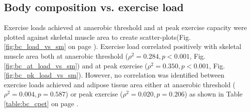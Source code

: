 \subsection{Body composition vs. exercise load}

Exercise loads achieved at anaerobic threshold and at peak exercise capacity were plotted against skeletal muscle area to create scatter-plots(Fig. \ref{fig:bc_load_vs_sm} on page \pageref{fig:bc_load_vs_sm}).  
Exercise load correlated positively with skeletal muscle area both at anaerobic threshold ($\rho^2 = 0.284, p < 0.001$, Fig. \ref{fig:bc_at_load_vs_sm}) and at peak exercise ($\rho^2 = 0.350, p < 0.001$, Fig. \ref{fig:bc_pk_load_vs_sm}). 
However, no correlation was identified between exercise loads achieved and adipose tissue area either at anaerobic threshold ($\rho^2 = 0.004, p = 0.587$) or peak exercise ($\rho^2 = 0.020, p = 0.206$) as shown in Table \ref{table:bc_cpet} on page \pageref{table:bc_cpet}.

